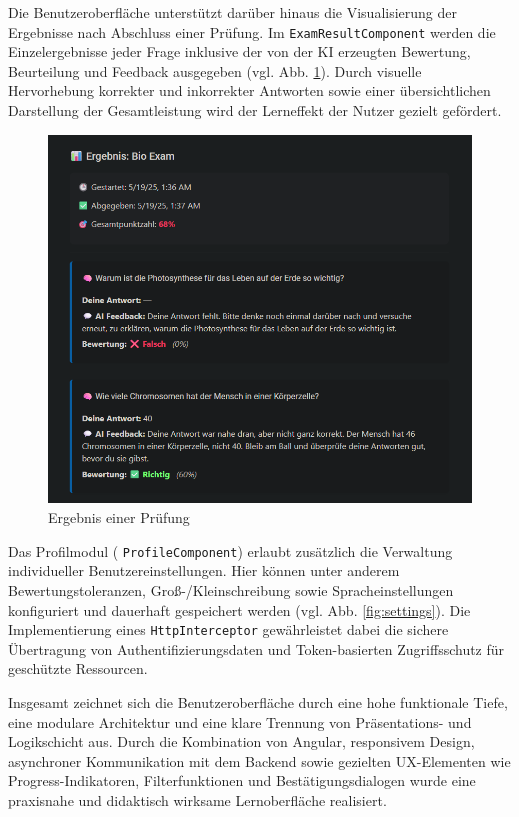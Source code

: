 \documentclass[a4paper,12pt]{article}
\begin{document}
Die Benutzeroberfläche unterstützt darüber hinaus die Visualisierung der Ergebnisse nach Abschluss einer Prüfung. Im 	\texttt{ExamResultComponent} werden die Einzelergebnisse jeder Frage inklusive der von der KI erzeugten Bewertung, Beurteilung und Feedback ausgegeben (vgl. Abb. \ref{fig:ergebnis}). Durch visuelle Hervorhebung korrekter und inkorrekter Antworten sowie einer übersichtlichen Darstellung der Gesamtleistung wird der Lerneffekt der Nutzer gezielt gefördert.

\begin{figure}[H]
    \centering
    \includegraphics[width=1\textwidth]{Bilder/Ergebnis.png}
    \caption{Ergebnis einer Prüfung}
    \label{fig:ergebnis}
\end{figure}

Das Profilmodul (	\texttt{ProfileComponent}) erlaubt zusätzlich die Verwaltung individueller Benutzereinstellungen. Hier können unter anderem Bewertungstoleranzen, Groß-/Kleinschreibung sowie Spracheinstellungen konfiguriert und dauerhaft gespeichert werden (vgl. Abb. \ref{fig:settings}). Die Implementierung eines 	\texttt{HttpInterceptor} gewährleistet dabei die sichere Übertragung von Authentifizierungsdaten und Token-basierten Zugriffsschutz für geschützte Ressourcen.

Insgesamt zeichnet sich die Benutzeroberfläche durch eine hohe funktionale Tiefe, eine modulare Architektur und eine klare Trennung von Präsentations- und Logikschicht aus. Durch die Kombination von Angular, responsivem Design, asynchroner Kommunikation mit dem Backend sowie gezielten UX-Elementen wie Progress-Indikatoren, Filterfunktionen und Bestätigungsdialogen wurde eine praxisnahe und didaktisch wirksame Lernoberfläche realisiert.
\end{document}
